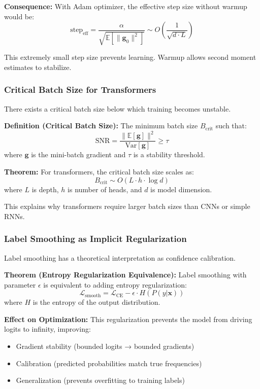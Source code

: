 \textbf{Consequence:} With Adam optimizer, the effective step size without warmup would be:
\begin{equation}
\text{step}_{\text{eff}} = \frac{\alpha}{\sqrt{\mathbb{E}[\|\mathbf{g}_0\|^2]}} \sim O\left(\frac{1}{\sqrt{d \cdot L}}\right)
\end{equation}

This extremely small step size prevents learning. Warmup allows second moment estimates to stabilize.

\subsubsection{Critical Batch Size for Transformers}

There exists a critical batch size below which training becomes unstable.

\textbf{Definition (Critical Batch Size):} The minimum batch size $B_{\text{crit}}$ such that:
\begin{equation}
\text{SNR} = \frac{\|\mathbb{E}[\mathbf{g}]\|^2}{\text{Var}[\mathbf{g}]} \geq \tau
\end{equation}
where $\mathbf{g}$ is the mini-batch gradient and $\tau$ is a stability threshold.

\textbf{Theorem:} For transformers, the critical batch size scales as:
\begin{equation}
B_{\text{crit}} \sim O(L \cdot h \cdot \log d)
\end{equation}
where $L$ is depth, $h$ is number of heads, and $d$ is model dimension.

This explains why transformers require larger batch sizes than CNNs or simple RNNs.

\subsubsection{Label Smoothing as Implicit Regularization}

Label smoothing has a theoretical interpretation as confidence calibration.

\textbf{Theorem (Entropy Regularization Equivalence):} Label smoothing with parameter $\epsilon$ is equivalent to adding entropy regularization:
\begin{equation}
\mathcal{L}_{\text{smooth}} = \mathcal{L}_{\text{CE}} - \epsilon \cdot H(P(y|\mathbf{x}))
\end{equation}
where $H$ is the entropy of the output distribution.

\textbf{Effect on Optimization:} This regularization prevents the model from driving logits to infinity, improving:
\begin{itemize}
    \item Gradient stability (bounded logits → bounded gradients)
    \item Calibration (predicted probabilities match true frequencies)
    \item Generalization (prevents overfitting to training labels)
\end{itemize}

